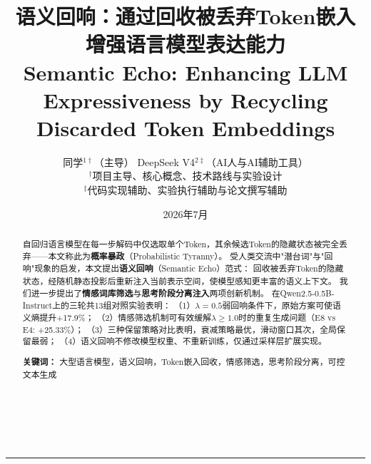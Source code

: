 \documentclass[a4paper, 11pt]{article}
\begin{document}
\noindent{\color{blue!60!black}\rule{\textwidth}{0.8pt}}\\[2pt]
\\[2pt]
{\color{blue!60!black}\rule{\textwidth}{0.8pt}}\\[1cm]

\title{\vspace{-0.5cm}
  \LARGE \textbf{语义回响：通过回收被丢弃Token嵌入\\增强语言模型表达能力}\\
  \large \textbf{Semantic Echo: Enhancing LLM Expressiveness by Recycling Discarded Token Embeddings}
  \vspace{-0.3cm}}
\author{
  同学${}^{1\dagger}$（主导）\qquad
  DeepSeek V4${}^{2\ddagger}$（AI人与AI辅助工具）\\[4pt]
  \small${}^\dagger$项目主导、核心概念、技术路线与实验设计 \\
  \small${}^\ddagger$代码实现辅助、实验执行辅助与论文撰写辅助}
\date{\small 2026年7月}
\maketitle
\thispagestyle{empty}

\begin{abstract}
\noindent 自回归语言模型在每一步解码中仅选取单个Token，其余候选Token的隐藏状态被完全丢弃——本文称此为\textbf{概率暴政}（Probabilistic Tyranny）。
受人类交流中"潜台词"与"回响"现象的启发，本文提出\textbf{语义回响}（Semantic Echo）范式：
回收被丢弃Token的隐藏状态，经随机静态投影后重新注入当前表示空间，使模型感知更丰富的语义上下文。
我们进一步提出了\textbf{情感词库筛选}与\textbf{思考阶段分离注入}两项创新机制。
在Qwen2.5-0.5B-Instruct上的三轮共13组对照实验表明：
（1）$\lambda=0.5$弱回响条件下，原始方案可使语义熵提升+17.9\%；
（2）情感筛选机制可有效缓解$\lambda\geq1.0$时的重复生成问题（E8 vs E4: +25.33\%）；
（3）三种保留策略对比表明，衰减策略最优，滑动窗口其次，全局保留最弱；
（4）语义回响不修改模型权重、不重新训练，仅通过采样层扩展实现。

\vspace{0.3cm}
\noindent \textbf{关键词：} 大型语言模型，语义回响，Token嵌入回收，情感筛选，思考阶段分离，可控文本生成
\end{abstract}
\end{document}
